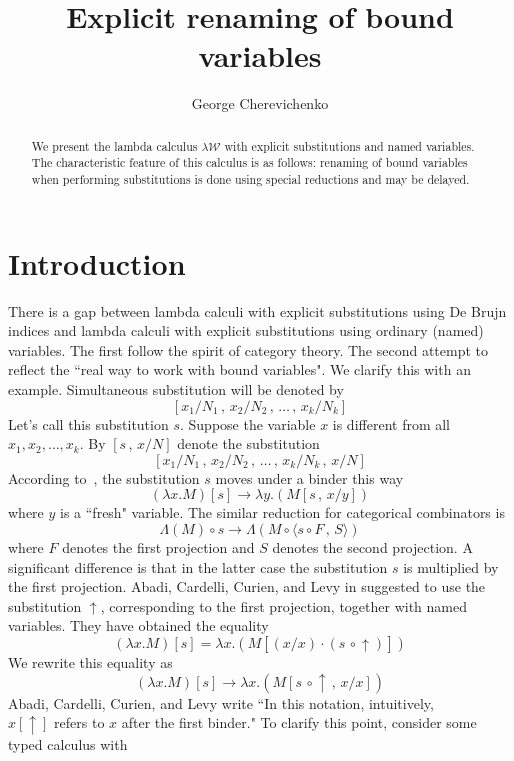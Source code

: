 \documentclass[11pt]{amsart}
\theoremstyle{plain}
\theoremstyle{definition}
\theoremstyle{remark}
\numberwithin{equation}{section}
\newcommand{\ci}{\circ}
\newcommand{\mi}{\,,\,}
\newcommand{\arrow}{\rightarrow}
\newcommand{\la}{\langle}
\newcommand{\ra}{\rangle}
\renewcommand{\pi}{\mathcal{W}}
\begin{document}
\title{Explicit renaming of bound variables}
\author{George Cherevichenko}

\begin{abstract}We present the lambda calculus $\lambda\pi$ with explicit
substitutions and named variables. The characteristic feature of
this calculus is as follows: renaming of bound variables when
performing substitutions is done using  special reductions and may
be delayed.
\end{abstract}


\maketitle


\section{Introduction}
There is a gap between lambda calculi with explicit substitutions
using De Brujn indices and lambda calculi with explicit
substitutions using ordinary (named) variables. The first follow
 the spirit of category theory. The second attempt to reflect
the ``real way to work with bound variables". We clarify this with
an example. Simultaneous substitution  will be denoted by
$$[x_1/N_1\mi x_2/N_2\mi\ldots\mi x_k/N_k]$$ Let's call this substitution $s$.
Suppose the variable $x$ is different from all
$x_1,x_2,\ldots,x_k$. By $[s\mi x/N]$ denote the substitution
 $$[x_1/N_1\mi x_2/N_2\mi\ldots\mi x_k/N_k\mi x/N]$$
According
 to~\cite{Stoughton},
the substitution $s$ moves under a binder this way
$$(\lambda x.M)[s]\arrow\lambda y.(M[s\mi x/y])$$
where $y$ is a ``fresh" variable.  The similar reduction for
categorical combinators is
$$\Lambda( M)\ci s\arrow\Lambda(M\ci\la s\ci F\mi S\ra)$$
where $F$ denotes the first projection and $S$ denotes the second
projection. A significant difference is that in the latter case
the substitution $s$ is multiplied by the first projection. Abadi,
Cardelli, Curien, and Levy in \cite{Abadi} suggested to use the
substitution $\uparrow$, corresponding to the first projection,
together with named variables. They have obtained the equality
$$(\lambda x.M)[s]=\lambda x.(M[(x/
x)\cdot(s\,\ci\!\uparrow)])$$ We  rewrite this equality as
$$(\lambda x.M)[s]\arrow\lambda x.(M[s\,\ci\!\uparrow\mi x/
x])$$ Abadi, Cardelli, Curien, and Levy write ``In this notation,
intuitively,\\ $x[\uparrow]$ refers to $x$ after the first
binder." To clarify this point, consider some typed calculus with
\end{document}
